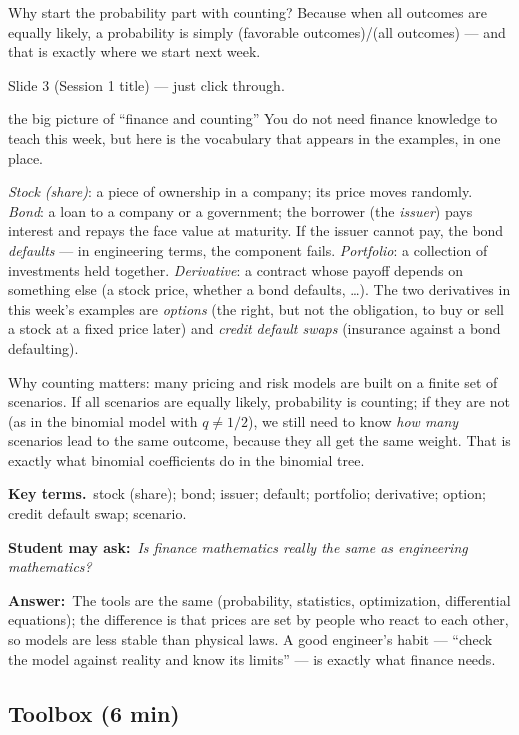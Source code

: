 \documentclass[11pt,a4paper,parskip=half]{scrartcl}
\newcommand{\terms}{\par\textbf{\color{plum}Key terms.}\ }
\newcommand{\sq}[1]{\par\textbf{\color{plum}Student may ask:}\ \emph{#1}\par}
\newcommand{\ans}{\textbf{Answer:}\ }
\newcommand{\slide}[1]{\marginpar{\raggedright\footnotesize\color{gray}slide #1}}
\begin{document}
Why start the probability part with counting? Because when all outcomes are
equally likely, a probability is simply (favorable outcomes)/(all outcomes)
--- and that is exactly where we start next week.

\begin{cue}
	Slide 3 (Session 1 title) --- just click through.
\end{cue}

\begin{bg}{the big picture of ``finance and counting''}
	You do not need finance knowledge to teach this week, but here is the
	vocabulary that appears in the examples, in one place.

	\emph{Stock (share)}: a piece of ownership in a company; its price moves
	randomly. \emph{Bond}: a loan to a company or a government; the borrower
	(the \emph{issuer}) pays interest and repays the face value at maturity.
	If the issuer cannot pay, the bond \emph{defaults} --- in engineering terms,
	the component fails. \emph{Portfolio}: a collection of investments held
	together. \emph{Derivative}: a contract whose payoff depends on something
	else (a stock price, whether a bond defaults, \ldots). The two derivatives
	in this week's examples are \emph{options} (the right, but not the
	obligation, to buy or sell a stock at a fixed price later) and \emph{credit
		default swaps} (insurance against a bond defaulting).

	Why counting matters: many pricing and risk models are built on a finite
	set of scenarios. If all scenarios are equally likely, probability is
	counting; if they are not (as in the binomial model with $q\neq 1/2$), we
	still need to know \emph{how many} scenarios lead to the same outcome,
	because they all get the same weight. That is exactly what binomial
	coefficients do in the binomial tree.

	\terms stock (share); bond; issuer; default; portfolio; derivative;
	option; credit default swap; scenario.

	\sq{Is finance mathematics really the same as engineering mathematics?}
	\ans The tools are the same (probability, statistics, optimization,
	differential equations); the difference is that prices are set by people
	who react to each other, so models are less stable than physical laws. A
	good engineer's habit --- ``check the model against reality and know its
	limits'' --- is exactly what finance needs.
\end{bg}

\subsection{Toolbox (6 min)}\slide{4}
\end{document}
